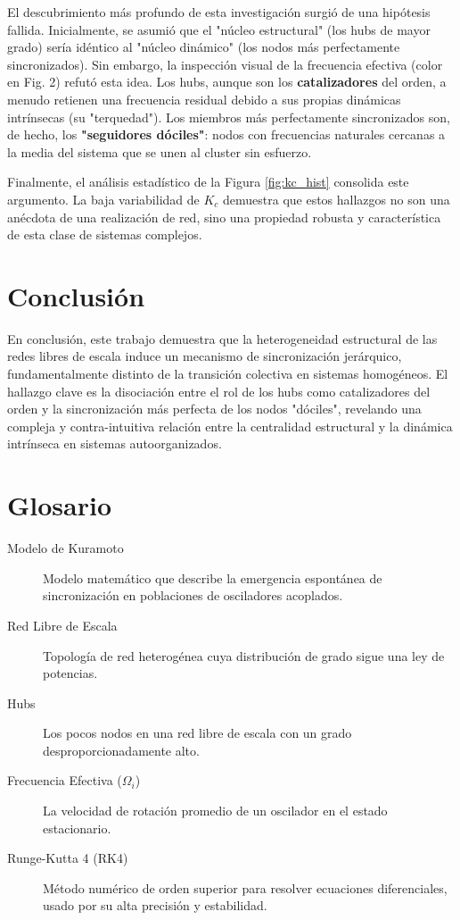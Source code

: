 \documentclass[12pt, a4paper]{article}
\begin{document}
El descubrimiento más profundo de esta investigación surgió de una hipótesis fallida. Inicialmente, se asumió que el "núcleo estructural" (los hubs de mayor grado) sería idéntico al "núcleo dinámico" (los nodos más perfectamente sincronizados). Sin embargo, la inspección visual de la frecuencia efectiva (color en Fig. 2) refutó esta idea. Los hubs, aunque son los \textbf{catalizadores} del orden, a menudo retienen una frecuencia residual debido a sus propias dinámicas intrínsecas (su "terquedad"). Los miembros más perfectamente sincronizados son, de hecho, los \textbf{"seguidores dóciles"}: nodos con frecuencias naturales cercanas a la media del sistema que se unen al cluster sin esfuerzo.

Finalmente, el análisis estadístico de la Figura \ref{fig:kc_hist} consolida este argumento. La baja variabilidad de \(K_c\) demuestra que estos hallazgos no son una anécdota de una realización de red, sino una propiedad robusta y característica de esta clase de sistemas complejos.

\section{Conclusión}

En conclusión, este trabajo demuestra que la heterogeneidad estructural de las redes libres de escala induce un mecanismo de sincronización jerárquico, fundamentalmente distinto de la transición colectiva en sistemas homogéneos. El hallazgo clave es la disociación entre el rol de los hubs como catalizadores del orden y la sincronización más perfecta de los nodos "dóciles", revelando una compleja y contra-intuitiva relación entre la centralidad estructural y la dinámica intrínseca en sistemas autoorganizados.

\appendix
\section{Glosario}

\begin{description}
    \item[Modelo de Kuramoto] Modelo matemático que describe la emergencia espontánea de sincronización en poblaciones de osciladores acoplados.
    \item[Red Libre de Escala] Topología de red heterogénea cuya distribución de grado sigue una ley de potencias.
    \item[Hubs] Los pocos nodos en una red libre de escala con un grado desproporcionadamente alto.
    \item[Frecuencia Efectiva (\(\Omega_i\))] La velocidad de rotación promedio de un oscilador en el estado estacionario.
    \item[Runge-Kutta 4 (RK4)] Método numérico de orden superior para resolver ecuaciones diferenciales, usado por su alta precisión y estabilidad.
\end{description}
\end{document}
